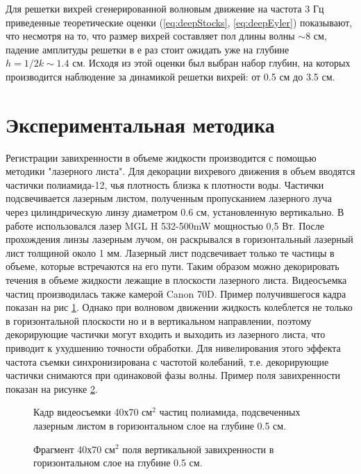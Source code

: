 Для решетки вихрей сгенерированной волновым движение на частота 3 Гц приведенные теоретические оценки (\ref{eq:deepStocks}, \ref{eq:deepEyler}) показывают, что несмотря на то, что размер вихрей составляет пол длины волны $\sim 8$ см, падение амплитуды решетки в е раз стоит ожидать уже на глубине $h = 1/2k \sim 1.4$ см. Исходя из этой оценки был выбран набор глубин, на которых производится наблюдение за динамикой решетки вихрей: от 0.5 см до 3.5 см.


\section{Экспериментальная методика} \label{sect6_2}
Регистрации завихренности в объеме жидкости производится с помощью методики "лазерного листа". Для декорации вихревого движения в объем вводятся частички полиамида-12, чья плотность близка к плотности воды. Частички подсвечивается лазерным листом, полученным пропусканием лазерного луча через цилиндрическую линзу диаметром 0.6 см, установленную вертикально. В работе использовался лазер MGL H 532-500mW мощностью 0,5 Вт. После прохождения линзы лазерным лучом, он раскрывался в горизонтальный лазерный лист толщиной около 1 мм. Лазерный лист подсвечивает только те частицы в объеме, которые встречаются на его пути. Таким образом можно декорировать течения в объеме жидкости лежащие в плоскости лазерного листа. Видеосъемка частиц производилась также камерой Canon 70D. Пример получившегося кадра показан на рис \ref{img:track0p5cm}. Однако при волновом движении жидкость колеблется не только в горизонтальной плоскости но и в вертикальном направлении, поэтому декорирующие частички могут входить и выходить из лазерного листа, что приводит к ухудшению точности обработки. Для нивелирования этого эффекта частота съемки синхронизирована с частотой колебаний, т.е. декорирующие частички снимаются при одинаковой фазы волны. Пример поля завихренности показан на рисунке \ref{img:vort0p5cm}.
\begin{figure}[ht]
  \caption{Кадр видеосъемки 40х70 см$^2$ частиц полиамида, подсвеченных лазерным листом в горизонтальном слое на глубине 0.5 см.}
  \label{img:track0p5cm}  
\end{figure}

\begin{figure}[ht]
  \caption{Фрагмент 40х70 см$^2$ поля вертикальной завихренности в горизонтальном слое на глубине 0.5 см.}
  \label{img:vort0p5cm}  
\end{figure}


